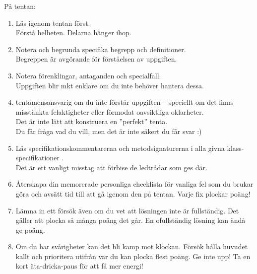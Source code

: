 \begin{Slide}{På tentan:} \SlideFontTiny
\begin{enumerate}
\item Läs igenom  tentan först. \\  Förstå helheten. Delarna hänger ihop.
\item Notera och begrunda specifika begrepp och definitioner. \\  Begreppen är avgörande för förståelsen av uppgiften.
\item Notera förenklingar, antaganden och specialfall. \\  Uppgiften blir mkt enklare om du inte behöver hantera dessa.
\item {} tentamensansvarig om du inte förstår uppgiften -- speciellt om det finns misstänkta felaktigheter eller förmodat oavsiktliga oklarheter. \\  Det är inte lätt att konstruera en ''perfekt'' tenta. \\ Du får fråga vad du vill, men det är inte säkert du får svar :)
\item Läs specifikationskommentarerna och metodsignaturerna i alla givna klass-specifikationer . \\  Det är ett vanligt misstag att förbise de ledtrådar som ges där.
\item Återskapa din memorerade personliga checklista för vanliga fel som du brukar göra och avsätt tid till att gå igenom den på tentan. Varje fix plockar poäng!
\item Lämna in ett försök även om du vet att lösningen inte är fullständig. Det gäller att plocka så många poäng det går. En ofullständig lösning kan ändå ge poäng.

\item Om du har svårigheter kan det bli kamp mot klockan. Försök hålla huvudet kallt och prioritera utifrån var du kan plocka flest poäng. Ge inte upp! Ta en kort äta-dricka-paus för att få mer energi!

\end{enumerate}
\end{Slide}

\ifkompendium\else

